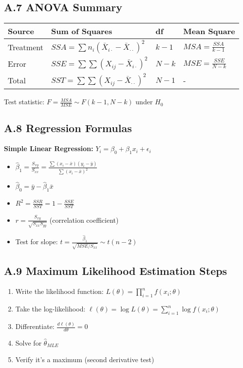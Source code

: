 \documentclass[12pt,a4paper]{amsart}
\theoremstyle{remark}
\begin{document}
\subsection{A.7 ANOVA Summary}

\begin{table}[h]
\centering
\begin{tabular}{|l|l|l|l|}
\hline
\textbf{Source} & \textbf{Sum of Squares} & \textbf{df} & \textbf{Mean Square} \\
\hline
Treatment & $SSA = \sum n_i(\bar{X}_{i\cdot} - \bar{X}_{\cdot\cdot})^2$ & $k-1$ & $MSA = \frac{SSA}{k-1}$ \\
\hline
Error & $SSE = \sum\sum(X_{ij} - \bar{X}_{i\cdot})^2$ & $N-k$ & $MSE = \frac{SSE}{N-k}$ \\
\hline
Total & $SST = \sum\sum(X_{ij} - \bar{X}_{\cdot\cdot})^2$ & $N-1$ & - \\
\hline
\end{tabular}
\end{table}

Test statistic: $F = \frac{MSA}{MSE} \sim F(k-1, N-k)$ under $H_0$

\subsection{A.8 Regression Formulas}

\textbf{Simple Linear Regression:} $Y_i = \beta_0 + \beta_1 x_i + \epsilon_i$

\begin{itemize}
\item $\hat{\beta}_1 = \frac{S_{xy}}{S_{xx}} = \frac{\sum(x_i-\bar{x})(y_i-\bar{y})}{\sum(x_i-\bar{x})^2}$
\item $\hat{\beta}_0 = \bar{y} - \hat{\beta}_1\bar{x}$
\item $R^2 = \frac{SSR}{SST} = 1 - \frac{SSE}{SST}$
\item $r = \frac{S_{xy}}{\sqrt{S_{xx}S_{yy}}}$ (correlation coefficient)
\item Test for slope: $t = \frac{\hat{\beta}_1}{\sqrt{MSE/S_{xx}}} \sim t(n-2)$
\end{itemize}

\subsection{A.9 Maximum Likelihood Estimation Steps}

\begin{enumerate}
\item Write the likelihood function: $L(\theta) = \prod_{i=1}^n f(x_i; \theta)$
\item Take the log-likelihood: $\ell(\theta) = \log L(\theta) = \sum_{i=1}^n \log f(x_i; \theta)$
\item Differentiate: $\frac{d\ell(\theta)}{d\theta} = 0$
\item Solve for $\hat{\theta}_{MLE}$
\item Verify it's a maximum (second derivative test)
\end{enumerate}
\end{document}
